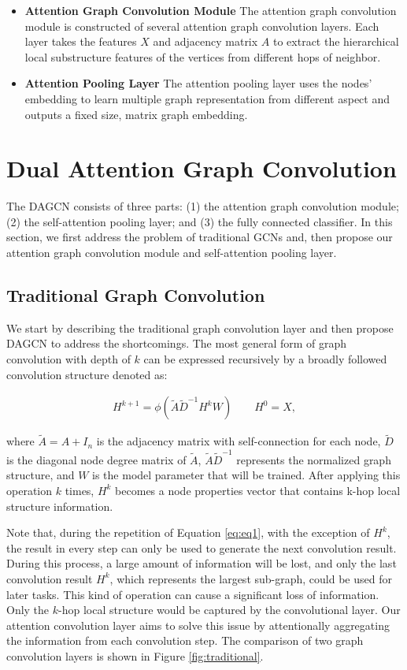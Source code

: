 \documentclass[conference]{IEEEtran}
\begin{document}
	   \begin{itemize}
            \item \textbf{Attention Graph Convolution Module} The attention graph convolution module is constructed of several attention graph convolution layers. Each layer takes the features $X$ and adjacency matrix $A$ to extract the hierarchical local substructure features of the vertices from different hops of neighbor. 
	        \item \textbf{Attention Pooling Layer} The attention pooling layer uses the nodes' embedding to learn multiple graph representation from different aspect and outputs a fixed size, matrix graph embedding.
	   \end{itemize}
	
	\section{Dual Attention Graph Convolution}
		The DAGCN consists of three parts: (1) the attention graph convolution module; (2) the self-attention pooling layer; and (3) the fully connected classifier. In this section, we first address the problem of traditional GCNs and, then propose our attention graph convolution module and self-attention pooling layer.
		
		\subsection{Traditional Graph Convolution} We start by describing the traditional graph convolution layer and then propose DAGCN to address the shortcomings. The most general form of graph convolution with depth of $k$ can be expressed recursively by a broadly followed convolution structure denoted as:

		\begin{eqnarray}
		H^{k+1} = \phi(\widetilde{A}\widetilde{D}^{-1}H^kW) \qquad 	 H^0=X,
		\label{eq:eq1}
		\end{eqnarray}
		
		where $\widetilde{A} = A + I_n$ is the adjacency matrix with self-connection for each node, $\widetilde{D}$ is the diagonal node degree matrix of $\widetilde{A}$, $\widetilde{A}\widetilde{D}^{-1}$ represents the normalized graph structure, and $W$ is the model parameter that will be trained. After applying this operation $k$ times, $H^k$ becomes a node properties vector that contains k-hop local structure information.
		
		Note that, during the repetition of Equation \ref{eq:eq1}, with the exception of $H^k$, the result in every step can only be used to generate the next convolution result. During this process, a large amount of information will be lost, and only the last convolution result $H^k$, which represents the largest sub-graph, could be used for later tasks. This kind of operation can cause a significant loss of information. Only the $k$-hop local structure would be captured by the convolutional layer. Our attention convolution layer aims to solve this issue by attentionally aggregating the information from each convolution step. The comparison of two graph convolution layers is shown in Figure \ref{fig:traditional}.
		
\end{document}
